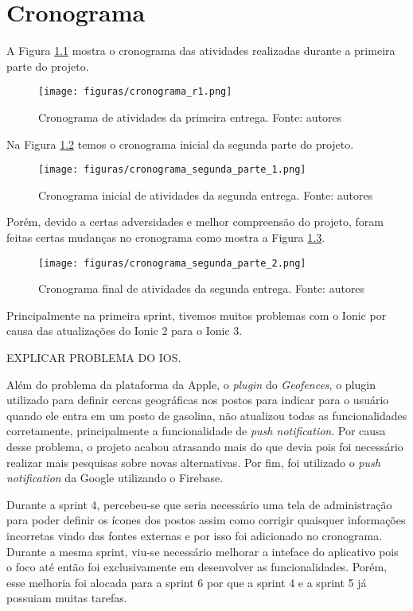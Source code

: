 \chapter[Cronograma]{Cronograma}
\label{chap:crono}

A Figura \ref{img:cronograma} mostra o cronograma das atividades realizadas durante a primeira parte do projeto.

\begin{figure}[H]
    \centering
    \texttt{[image: figuras/cronograma\_r1.png]}
    \caption[Cronograma de atividades da primeira entrega.]{Cronograma de atividades da primeira entrega. Fonte: autores}
    \label{img:cronograma}
\end{figure}

Na Figura \ref{img:cronograma2inicial} temos o cronograma inicial da segunda parte do projeto.

\begin{figure}[H]
    \centering
    \texttt{[image: figuras/cronograma\_segunda\_parte\_1.png]}
    \caption[Cronograma inicial de atividades da segunda entrega.]{Cronograma inicial de atividades da segunda entrega. Fonte: autores}
    \label{img:cronograma2inicial}
\end{figure}

Porém, devido a certas adversidades e melhor compreensão do projeto, foram feitas certas mudanças no cronograma como mostra a Figura \ref{img:cronogramafinal}.

\begin{figure}[H]
    \centering
    \texttt{[image: figuras/cronograma\_segunda\_parte\_2.png]}
    \caption[Cronograma final de atividades da segunda entrega.]{Cronograma final de atividades da segunda entrega. Fonte: autores}
    \label{img:cronogramafinal}
\end{figure}

Principalmente na primeira sprint, tivemos muitos problemas com o Ionic por causa das atualizações do Ionic 2 para o Ionic 3.

EXPLICAR PROBLEMA DO IOS.

Além do problema da plataforma da Apple, o \textit{plugin} do \textit{Geofences}, o plugin utilizado para definir cercas geográficas nos postos para indicar para o usuário quando ele entra em um posto de gasolina, não atualizou todas as funcionalidades corretamente, principalmente a funcionalidade de \textit{push notification}. Por causa desse problema, o projeto acabou atrasando mais do que devia pois foi necessário realizar mais pesquisas sobre novas alternativas. Por fim, foi utilizado o \textit{push notification} da Google utilizando o Firebase.

Durante a sprint 4, percebeu-se que seria necessário uma tela de administração para poder definir os ícones dos postos assim como corrigir quaisquer informações incorretas vindo das fontes externas e por isso foi adicionado no cronograma. Durante a mesma sprint, viu-se necessário melhorar a inteface do aplicativo pois o foco até então foi exclusivamente em desenvolver as funcionalidades. Porém, esse melhoria foi alocada para a sprint 6 por que a sprint 4 e a sprint 5 já possuiam muitas tarefas.
